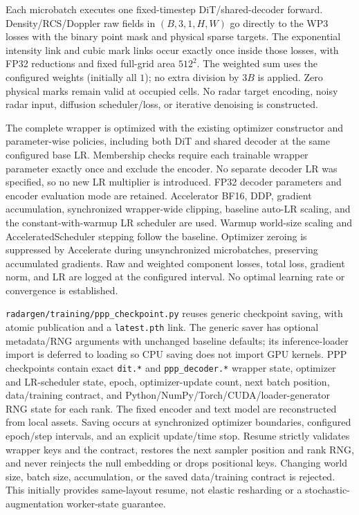 \documentclass[11pt,a4paper]{article}
\begin{document}
Each microbatch executes one fixed-timestep DiT/shared-decoder forward.
Density/RCS/Doppler raw fields in \((B,3,1,H,W)\) go directly to the WP3
losses with the binary point mask and physical sparse targets. The
exponential intensity link and cubic mark links occur exactly once inside
those losses, with FP32 reductions and fixed full-grid area \(512^2\).
The weighted sum uses the configured weights (initially all \(1\)); no
extra division by \(3B\) is applied. Zero physical marks remain valid at
occupied cells. No radar target encoding, noisy radar input, diffusion
scheduler/loss, or iterative denoising is constructed.

The complete wrapper is optimized with the existing optimizer constructor
and parameter-wise policies, including both DiT and shared decoder at the
same configured base LR. Membership checks require each trainable wrapper
parameter exactly once and exclude the encoder. No separate decoder LR
was specified, so no new LR multiplier is introduced. FP32 decoder
parameters and encoder evaluation mode are retained. Accelerator BF16,
DDP, gradient accumulation, synchronized wrapper-wide clipping, baseline
auto-LR scaling, and the constant-with-warmup LR scheduler are used.
Warmup world-size scaling and AcceleratedScheduler stepping follow the
baseline. Optimizer zeroing is suppressed by Accelerate during unsynchronized
microbatches, preserving accumulated gradients. Raw and weighted component
losses, total loss, gradient norm, and LR are logged at the configured
interval. No optimal learning rate or convergence is established.

\texttt{radargen/training/ppp\_checkpoint.py} reuses generic checkpoint
saving, with atomic publication and a \texttt{latest.pth} link. The generic
saver has optional metadata/RNG arguments with unchanged baseline defaults;
its inference-loader import is deferred to loading so CPU saving does not
import GPU kernels. PPP checkpoints contain exact \texttt{dit.*} and
\texttt{ppp\_decoder.*} wrapper state, optimizer and LR-scheduler state,
epoch, optimizer-update count, next batch position, data/training contract,
and Python/NumPy/Torch/CUDA/loader-generator RNG state for each rank.
The fixed encoder and text model are reconstructed from local assets.
Saving occurs at synchronized optimizer boundaries, configured epoch/step
intervals, and an explicit update/time stop. Resume strictly validates
wrapper keys and the contract, restores the next sampler position and
rank RNG, and never reinjects the null embedding or drops positional keys.
Changing world size, batch size, accumulation, or the saved data/training
contract is rejected. This initially provides same-layout resume, not
elastic resharding or a stochastic-augmentation worker-state guarantee.
\end{document}
